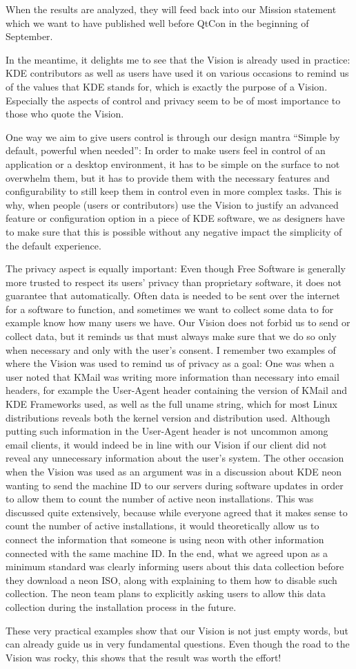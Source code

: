 When the results are analyzed, they will feed back into our Mission statement which we want to have published well before QtCon in the beginning of September.

In the meantime, it delights me to see that the Vision is already used in practice: KDE contributors as well as users have used it on various occasions to remind us of the values that KDE stands for, which is exactly the purpose of a Vision. Especially the aspects of control and privacy seem to be of most importance to those who quote the Vision. 

One way we aim to give users control is through our design mantra ``Simple by default, powerful when needed'': In order to make users feel in control of an application or a desktop environment, it has to be simple on the surface to not overwhelm them, but it has to provide them with the necessary features and configurability to still keep them in control even in more complex tasks. This is why, when people (users or contributors) use the Vision to justify an advanced feature or configuration option in a piece of KDE software, we as designers have to make sure that this is possible without any negative impact the simplicity of the default experience.

The privacy aspect is equally important: Even though Free Software is generally more trusted to respect its users' privacy than proprietary software, it does not guarantee that automatically. Often data is needed to be sent over the internet for a software to function, and sometimes we want to collect some data to for example know how many users we have. Our Vision does not forbid us to send or collect data, but it reminds us that must always make sure that we do so only when necessary and only with the user's consent. I remember two examples of where the Vision was used to remind us of privacy as a goal: One was when a user noted that KMail was writing more information than necessary into email headers, for example the User-Agent header containing the version of KMail and KDE Frameworks used, as well as the full uname string, which for most Linux distributions reveals both the kernel version and distribution used. Although putting such information in the User-Agent header is not uncommon among email clients, it would indeed be in line with our Vision if our client did not reveal any unnecessary information about the user's system. The other occasion when the Vision was used as an argument was in a discussion about KDE neon wanting to send the machine ID to our servers during software updates in order to allow them to count the number of active neon installations. This was discussed quite extensively, because while everyone agreed that it makes sense to count the number of active installations, it would theoretically allow us to connect the information that someone is using neon with other information connected with the same machine ID. In the end, what we agreed upon as a minimum standard was clearly informing users about this data collection before they download a neon ISO, along with explaining to them how to disable such collection. The neon team plans to explicitly asking users to allow this data collection during the installation process in the future.

These very practical examples show that our Vision is not just empty words, but can already guide us in very fundamental questions. Even though the road to the Vision was rocky, this shows that the result was worth the effort!
